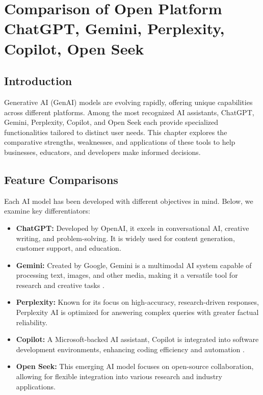 \documentclass[a4paper,headinclude=on,footinclude=on,12pt,oneside]{scrbook}
\begin{document}

\chapter{Comparison of Open Platform ChatGPT, Gemini, Perplexity, Copilot, Open Seek}


\section{Introduction}

Generative AI (GenAI) models are evolving rapidly, offering unique capabilities across different platforms. Among the most recognized AI assistants, ChatGPT, Gemini, Perplexity, Copilot, and Open Seek each provide specialized functionalities tailored to distinct user needs. This chapter explores the comparative strengths, weaknesses, and applications of these tools to help businesses, educators, and developers make informed decisions.

\section{Feature Comparisons}

Each AI model has been developed with different objectives in mind. Below, we examine key differentiators:

\begin{itemize}
	\item \textbf{ChatGPT:} Developed by OpenAI, it excels in conversational AI, creative writing, and problem-solving. It is widely used for content generation, customer support, and education.
	\item \textbf{Gemini:} Created by Google, Gemini is a multimodal AI system capable of processing text, images, and other media, making it a versatile tool for research and creative tasks .
	\item \textbf{Perplexity:} Known for its focus on high-accuracy, research-driven responses, Perplexity AI is optimized for answering complex queries with greater factual reliability.
	\item \textbf{Copilot:} A Microsoft-backed AI assistant, Copilot is integrated into software development environments, enhancing coding efficiency and automation .
	\item \textbf{Open Seek:} This emerging AI model focuses on open-source collaboration, allowing for flexible integration into various research and industry applications.
\end{itemize}
\end{document}
